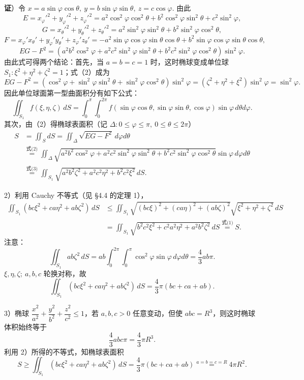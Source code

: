 \documentclass[UTF8,12pt,a4paper,fontset=fandol]{ctexart}
\providecommand{\xlongequal}[1]{\overset{#1}{=}}
\begin{document}
\noindent\textbf{证}）令 $x=a\sin\varphi\cos\theta,\ y=b\sin\varphi\sin\theta,\ z=c\cos\varphi$. 由此
\[
E=x_\varphi'^2+y_\varphi'^2+z_\varphi'^2
=a^2\cos^2\varphi\cos^2\theta+b^2\cos^2\varphi\sin^2\theta+c^2\sin^2\varphi,
\]
\[
G=x_\theta'^2+y_\theta'^2+z_\theta'^2
=a^2\sin^2\varphi\sin^2\theta+b^2\sin^2\varphi\cos^2\theta,
\]
\[
F=x_\varphi'x_\theta'+y_\varphi'y_\theta'+z_\varphi'z_\theta'
=-a^2\sin\varphi\cos\varphi\sin\theta\cos\theta
+b^2\sin\varphi\cos\varphi\sin\theta\cos\theta,
\]
\[
EG-F^2=(a^2b^2\cos^2\varphi+a^2c^2\sin^2\varphi\sin^2\theta+b^2c^2\sin^2\varphi\cos^2\theta)\sin^2\varphi. \tag{2}
\]
由此式可得两个结论：首先，当 $a=b=c=1$ 时，这时椭球变成单位球 $S_1:\xi^2+\eta^2+\zeta^2=1$；式（2）成为
\[
EG-F^2=(\cos^2\varphi+\sin^2\varphi\sin^2\theta+\sin^2\varphi\cos^2\theta)\sin^2\varphi
=(\zeta^2+\eta^2+\xi^2)\sin^2\varphi=\sin^2\varphi.
\]
因此单位球面第一型曲面积分有如下公式：
\[
\iint_{S_1}f(\xi,\eta,\zeta)\,dS
=\int_0^\pi\int_0^{2\pi}f(\sin\varphi\cos\theta,\sin\varphi\sin\theta,\cos\varphi)\sin\varphi\,d\theta d\varphi. \tag{3}
\]
其次，由（2）得椭球表面积（记 $\Delta:0\le\varphi\le\pi,\ 0\le\theta\le2\pi$）
\[
\begin{aligned}
S&=\iint_SdS=\iint_\Delta\sqrt{EG-F^2}\,d\varphi d\theta\\
&\xlongequal{\text{式(2)}}\iint_\Delta\sqrt{a^2b^2\cos^2\varphi+a^2c^2\sin^2\varphi\sin^2\theta+b^2c^2\sin^2\varphi\cos^2\theta}\sin\varphi\,d\varphi d\theta\\
&\xlongequal{\text{式(3)}}\iint_{S_1}\sqrt{a^2b^2\zeta^2+a^2c^2\eta^2+b^2c^2\xi^2}\,dS.
\end{aligned}
\]

2）利用 Cauchy 不等式（见 §4.4 的定理 1），
\[
\begin{aligned}
\iint_{S_1}(bc\xi^2+ca\eta^2+ab\zeta^2)\,dS
&\le\iint_{S_1}\sqrt{(bc\xi)^2+(ca\eta)^2+(ab\zeta)^2}\sqrt{\xi^2+\eta^2+\zeta^2}\,dS\\
&=\iint_{S_1}\sqrt{b^2c^2\xi^2+c^2a^2\eta^2+a^2b^2\zeta^2}\,dS
\xlongequal{\text{式(1)}}S.
\end{aligned}
\]
注意：
\[
\iint_{S_1}ab\zeta^2\,dS
=ab\int_0^{2\pi}\int_0^\pi\cos^2\varphi\sin\varphi\,d\varphi d\theta
=\frac43ab\pi.
\]
$\xi,\eta,\zeta;\ a,b,c$ 轮换对称，故
\[
\iint_{S_1}(bc\xi^2+ca\eta^2+ab\zeta^2)\,dS=\frac43\pi(bc+ca+ab).
\]

3）椭球 $\dfrac{x^2}{a^2}+\dfrac{y^2}{b^2}+\dfrac{z^2}{c^2}\le1$，若 $a,b,c>0$ 任意变动，但使 $abc=R^3$，则这时椭球体积始终等于
\[
\frac43abc\pi=\frac43\pi R^3.
\]
利用 2）所得的不等式，知椭球表面积
\[
S\ge\iint_{S_1}(bc\xi^2+ca\eta^2+ab\zeta^2)\,dS=\frac43\pi(bc+ca+ab)
\xlongequal{a=b=c=R}4\pi R^2.
\]
\end{document}
